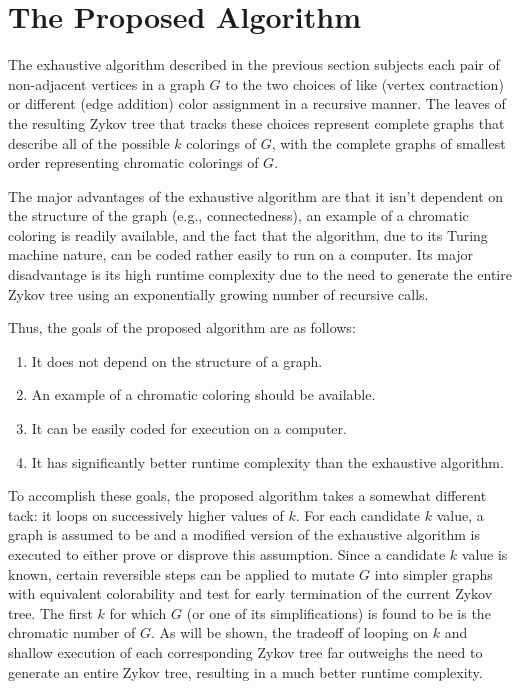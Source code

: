 \section{The Proposed Algorithm}

The exhaustive algorithm described in the previous section subjects each pair of non-adjacent vertices in a graph
\(G\) to the two choices of like (vertex contraction) or different (edge addition) color assignment in a recursive
manner.  The leaves of the resulting Zykov tree that tracks these choices represent complete graphs that describe
all of the possible \(k\) colorings of \(G\), with the complete graphs of smallest order representing chromatic
colorings of \(G\).

The major advantages of the exhaustive algorithm are that it isn't dependent on the structure of the graph (e.g.,
connectedness), an example of a chromatic coloring is readily available, and the fact that the algorithm, due to
its Turing machine nature, can be coded rather easily to run on a computer.  Its major disadvantage is its high
runtime complexity due to the need to generate the entire Zykov tree using an exponentially growing number of
recursive calls.

Thus, the goals of the proposed algorithm are as follows:
\begin{enumerate}
\item It does not depend on the structure of a graph.
\item An example of a chromatic coloring should be available.
\item It can be easily coded for execution on a computer.
\item It has significantly better runtime complexity than the exhaustive algorithm.
\end{enumerate}

To accomplish these goals, the proposed algorithm takes a somewhat different tack: it loops on successively higher
values of \(k\).  For each candidate \(k\) value, a graph is assumed to be  and a modified version of
the exhaustive algorithm is executed to either prove or disprove this assumption.  Since a candidate \(k\) value is
known, certain reversible steps can be applied to mutate \(G\) into simpler graphs with equivalent colorability and
test for early termination of the current Zykov tree.  The first \(k\) for which \(G\) (or one of its
simplifications) is found to be  is the chromatic number of \(G\).  As will be shown, the tradeoff of
looping on \(k\) and shallow execution of each corresponding Zykov tree far outweighs the need to generate an
entire Zykov tree, resulting in a much better runtime complexity.

